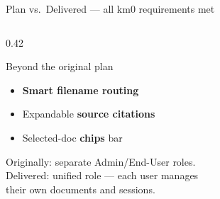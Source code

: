 \documentclass[aspectratio=169]{beamer}
\begin{document}
\begin{frame}[t,shrink=3]{Plan vs.\ Delivered — all km0 requirements met}
\begin{columns}[t]
\begin{column}{0.42\textwidth}
\begin{block}{Beyond the original plan}
\begin{itemize}
          \item \textbf{Smart filename routing}
          \item Expandable \textbf{source citations}
          \item Selected-doc \textbf{chips} bar
        \end{itemize}
      \end{block}
      \vspace{0.15cm}
      {\footnotesize\color{MUT}
        Originally: separate Admin/End-User roles.\\
        Delivered: unified role — each user manages\\
        their own documents and sessions.}
    \end{column}
  \end{columns}
\end{frame}
\end{document}
